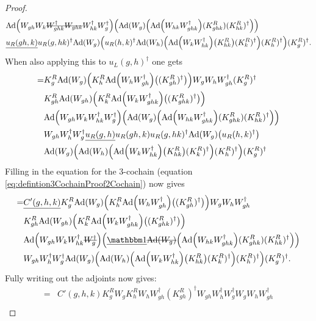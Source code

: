 \documentclass[11pt,a4paper,twoside]{article}
\numberwithin{equation}{section}
\begin{document}
{\begin{proof}
\begin{align}
			\nonumber
			&\Ad{W_{gh}W_k\stkout{W_{ghk}^\dagger W_{ghk}}W_{hk}^\dagger W_{g}^\dagger}  \left(\Ad{W_g}\left( \Ad{W_{hk}W_{ghk}^\dagger}(K^R_{ghk})(K^R_{hk})^{\dagger} \right)\right)\\
			\nonumber
			&\underline{u_R(gh,k)}u_R(g,hk)^\dagger\Ad{W_g}\left(u_R(h,k)^\dagger \Ad{W_h}\left(\Ad{W_kW_{hk}^\dagger}\left(K_{hk}^R\right)(K^R_k)^\dagger\right)(K^R_h)^\dagger\right)(K^R_g)^\dagger.
		\end{align}
		When also applying this to $u_L(g,h)^\dagger$ one gets
		\begin{align}
			=&K_g^R\Ad{W_g}\left(K_h^R\Ad{W_hW_{gh}^\dagger}\left((K_{gh}^R)^\dagger\right)\right)W_gW_hW_{gh}^\dagger (K^R_g)^\dagger\\
			\nonumber
			&K_{gh}^R\Ad{W_{gh}}\left(K_k^R\Ad{W_kW_{ghk}^\dagger}\left((K_{ghk}^R)^\dagger\right)\right)\\
			\nonumber
			&\Ad{W_{gh}W_kW_{hk}^\dagger W_{g}^\dagger}  \left(\Ad{W_g}\left( \Ad{W_{hk}W_{ghk}^\dagger}(K^R_{ghk})(K^R_{hk})^{\dagger} \right)\right)\\
			\nonumber
			&W_{gh}W_h^\dagger W_g^\dagger \underline{u_R(g,h)} u_R(gh,k)u_R(g,hk)^\dagger\Ad{W_g}\left(u_R(h,k)^\dagger\right)\\
			\nonumber
			&\Ad{W_g}\left(\Ad{W_h}\left(\Ad{W_kW_{hk}^\dagger}\left(K_{hk}^R\right)(K^R_k)^\dagger\right)(K^R_h)^\dagger\right)(K^R_g)^\dagger
		\end{align}
		Filling in the equation for the 3-cochain (equation \eqref{eq:defintion3CochainProof2Cochain}) now gives
		\begin{align}
			=&\underline{C'(g,h,k)}K_g^R\Ad{W_g}\left(K_h^R\Ad{W_hW_{gh}^\dagger}\left((K_{gh}^R)^\dagger\right)\right)W_gW_hW_{gh}^\dagger \\
			\nonumber
			&K_{gh}^R\Ad{W_{gh}}\left(K_k^R\Ad{W_kW_{ghk}^\dagger}\left((K_{ghk}^R)^\dagger\right)\right)\\
			\nonumber
			&\Ad{W_{gh}W_kW_{hk}^\dagger \stkout{W_{g}^\dagger}}  \left(\underline{\id}\stkout{\Ad{W_g}}\left( \Ad{W_{hk}W_{ghk}^\dagger}(K^R_{ghk})(K^R_{hk})^{\dagger} \right)\right)\\
			\nonumber
			&W_{gh}W_h^\dagger W_g^\dagger\Ad{W_g}\left(\Ad{W_h}\left(\Ad{W_kW_{hk}^\dagger}\left(K_{hk}^R\right)(K^R_k)^\dagger\right)(K^R_h)^\dagger\right)(K^R_g)^\dagger.
		\end{align}
		Fully writing out the adjoints now gives:
		\begin{align}
			=&C'(g,h,k)K_g^RW_gK_h^RW_hW_{gh}^\dagger (K_{gh}^R)^\dagger W_{gh}W_h^\dagger W_g^\dagger W_gW_hW_{gh}^\dagger \\

\end{align}
\end{proof}}
\end{document}
